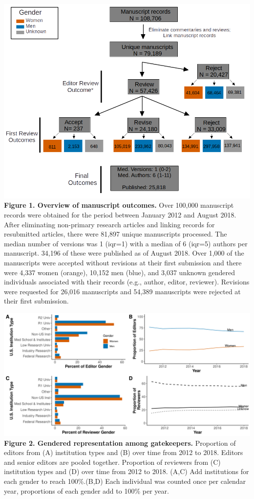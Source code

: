 \documentclass[11pt,]{article}
\begin{document}
\includegraphics{population_diagram.png} \textbf{Figure 1. Overview of
manuscript outcomes.} Over 100,000 manuscript records were obtained for
the period between January 2012 and August 2018. After eliminating
non-primary research articles and linking records for resubmitted
articles, there were 81,897 unique manuscripts processed. The median
number of versions was 1 (iqr=1) with a median of 6 (iqr=5) authors per
manuscript. 34,196 of these were published as of August 2018. Over 1,000
of the manuscripts were accepted without revisions at their first
submission and there were 4,337 women (orange), 10,152 men (blue), and
3,037 unknown gendered individuals associated with their records (e.g.,
author, editor, reviewer). Revisions were requested for 26,016
manuscripts and 54,389 manuscripts were rejected at their first
submission.

\newpage

\includegraphics{Figure_1.png} \textbf{Figure 2. Gendered representation
among gatekeepers.} Proportion of editors from (A) institution types and
(B) over time from 2012 to 2018. Editors and senior editors are pooled
together. Proportion of reviewers from (C) institution types and (D)
over time from 2012 to 2018. (A,C) Add institutions for each gender to
reach 100\%.(B,D) Each individual was counted once per calendar year,
proportions of each gender add to 100\% per year.
\end{document}
